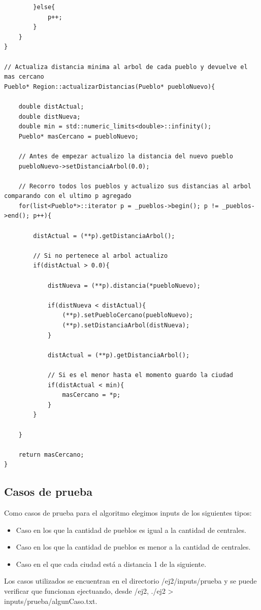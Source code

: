 \begin{lstlisting}
		}else{
			p++;
		}
	}
}

// Actualiza distancia minima al arbol de cada pueblo y devuelve el mas cercano
Pueblo* Region::actualizarDistancias(Pueblo* puebloNuevo){

	double distActual;
	double distNueva;
	double min = std::numeric_limits<double>::infinity();
	Pueblo* masCercano = puebloNuevo;

	// Antes de empezar actualizo la distancia del nuevo pueblo
	puebloNuevo->setDistanciaArbol(0.0);

	// Recorro todos los pueblos y actualizo sus distancias al arbol comparando con el ultimo p agregado
	for(list<Pueblo*>::iterator p = _pueblos->begin(); p != _pueblos->end(); p++){

		distActual = (**p).getDistanciaArbol();

		// Si no pertenece al arbol actualizo
		if(distActual > 0.0){

			distNueva = (**p).distancia(*puebloNuevo);
			
			if(distNueva < distActual){
				(**p).setPuebloCercano(puebloNuevo);
				(**p).setDistanciaArbol(distNueva);
			}

			distActual = (**p).getDistanciaArbol();

			// Si es el menor hasta el momento guardo la ciudad
			if(distActual < min){
				masCercano = *p;
			}
		}
	
	}

	return masCercano;
}

\end{lstlisting}

\subsection{Casos de prueba}

Como casos de prueba para el algoritmo elegimos inputs de los siguientes tipos:
\begin{itemize}
\item Caso en los que la cantidad de pueblos es igual a la cantidad de centrales.
\item Caso en los que la cantidad de pueblos es menor a la cantidad de centrales.
\item Caso en el que cada ciudad est\'a a distancia 1 de la siguiente.
\end{itemize}

Los casos utilizados se encuentran en el directorio /ej2/inputs/prueba y se puede verificar que funcionan ejectuando, desde /ej2, ./ej2 > inputs/prueba/algunCaso.txt.

